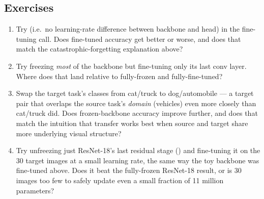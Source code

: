 \subsection*{Exercises}
\begin{enumerate}
  \item Try  (i.e.\ no learning-rate difference between backbone and head) in the fine-tuning call. Does fine-tuned accuracy get better or worse, and does that match the catastrophic-forgetting explanation above?
  \item Try freezing \emph{most} of the backbone but fine-tuning only its last conv layer. Where does that land relative to fully-frozen and fully-fine-tuned?
  \item Swap the target task's classes from cat/truck to dog/automobile --- a target pair that overlaps the source task's \emph{domain} (vehicles) even more closely than cat/truck did. Does frozen-backbone accuracy improve further, and does that match the intuition that transfer works best when source and target share more underlying visual structure?
  \item Try unfreezing just ResNet-18's last residual stage () and fine-tuning it on the 30 target images at a small learning rate, the same way the toy backbone was fine-tuned above. Does it beat the fully-frozen ResNet-18 result, or is 30 images too few to safely update even a small fraction of 11 million parameters?
\end{enumerate}

\vfill
{}
